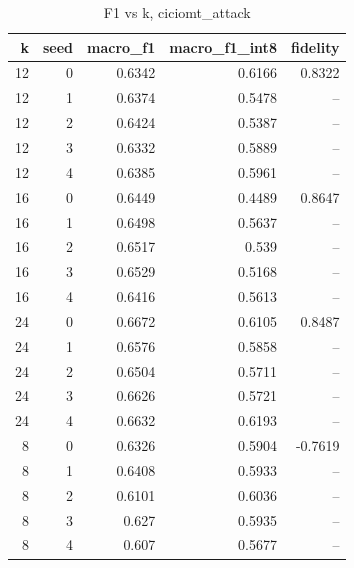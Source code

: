 \begin{table}
\caption{F1 vs k, ciciomt_attack}
\begin{tabular}{rrrrr}
\toprule
k & seed & macro_f1 & macro_f1_int8 & fidelity \\
\midrule
12 & 0 & 0.6342 & 0.6166 & 0.8322 \\
12 & 1 & 0.6374 & 0.5478 & -- \\
12 & 2 & 0.6424 & 0.5387 & -- \\
12 & 3 & 0.6332 & 0.5889 & -- \\
12 & 4 & 0.6385 & 0.5961 & -- \\
16 & 0 & 0.6449 & 0.4489 & 0.8647 \\
16 & 1 & 0.6498 & 0.5637 & -- \\
16 & 2 & 0.6517 & 0.539 & -- \\
16 & 3 & 0.6529 & 0.5168 & -- \\
16 & 4 & 0.6416 & 0.5613 & -- \\
24 & 0 & 0.6672 & 0.6105 & 0.8487 \\
24 & 1 & 0.6576 & 0.5858 & -- \\
24 & 2 & 0.6504 & 0.5711 & -- \\
24 & 3 & 0.6626 & 0.5721 & -- \\
24 & 4 & 0.6632 & 0.6193 & -- \\
8 & 0 & 0.6326 & 0.5904 & -0.7619 \\
8 & 1 & 0.6408 & 0.5933 & -- \\
8 & 2 & 0.6101 & 0.6036 & -- \\
8 & 3 & 0.627 & 0.5935 & -- \\
8 & 4 & 0.607 & 0.5677 & -- \\
\bottomrule
\end{tabular}
\end{table}
